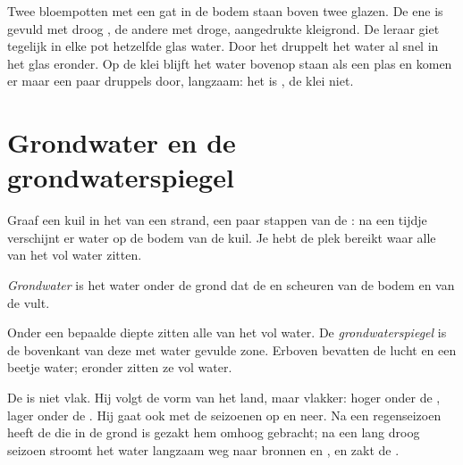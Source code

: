 \begin{inthelab}
Twee bloempotten met een gat in de bodem staan boven twee glazen. De ene
is gevuld met droog , de andere met droge, aangedrukte kleigrond. De
leraar giet tegelijk in elke pot hetzelfde glas water. Door het 
druppelt het water al snel in het glas eronder. Op de klei blijft het
water bovenop staan als een plas en komen er maar een paar druppels door,
langzaam: het  is , de klei niet.
\end{inthelab}

\section{Grondwater en de grondwaterspiegel}

Graaf een kuil in het  van een strand, een paar stappen van de : na
een tijdje verschijnt er water op de bodem van de kuil. Je hebt de plek
bereikt waar alle  van het  vol water zitten.

\begin{definition}[Grondwater]\label{def:g6:water-underground:groundwater}
\emph{Grondwater} is het water onder de grond dat de
 en scheuren van de bodem en van de  vult.
\end{definition}

\begin{definition}[Grondwaterspiegel]\label{def:g6:water-underground:water-table}
Onder een bepaalde diepte zitten alle  van het  vol water.
De \emph{grondwaterspiegel} is de bovenkant van
deze met water gevulde zone. Erboven bevatten de  lucht en een
beetje water; eronder zitten ze vol water.
\end{definition}

De  is niet vlak. Hij volgt de vorm van het land, maar
vlakker: hoger onder de , lager onder de . Hij gaat ook met de
seizoenen op en neer. Na een regenseizoen heeft de  die in de grond is
gezakt hem omhoog gebracht; na een lang droog seizoen stroomt het water
langzaam weg naar bronnen en , en zakt de .

